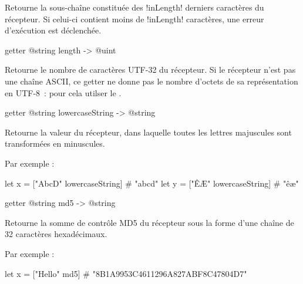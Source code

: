 Retourne la sous-chaîne constituée des \ggs!inLength! derniers caractères du récepteur. Si celui-ci contient moins de \ggs!inLength! caractères, une erreur d'exécution est déclenchée.









\begin{galgasbox}
getter @string length -> @uint
\end{galgasbox}

Retourne le nombre de caractères UTF-32 du récepteur. Si le récepteur n'est pas une chaîne ASCII, ce getter ne donne pas le nombre d'octets de sa représentation en UTF-8~: pour cela utilser le .









\begin{galgasbox}
getter @string lowercaseString -> @string
\end{galgasbox}

Retourne la valeur du récepteur, dans laquelle toutes les lettres majuscules sont transformées en minuscules.

Par exemple :
\begin{galgas}
let x = ["AbcD" lowercaseString] # "abcd"
let y = ["ÊÆ" lowercaseString] # "êæ"
\end{galgas}








\begin{galgasbox}
getter @string md5 -> @string
\end{galgasbox}

Retourne la somme de contrôle MD5 du récepteur sous la forme d'une chaîne de 32 caractères hexadécimaux.

Par exemple :
\begin{galgas}
let x = ["Hello" md5] # "8B1A9953C4611296A827ABF8C47804D7"
\end{galgas}








